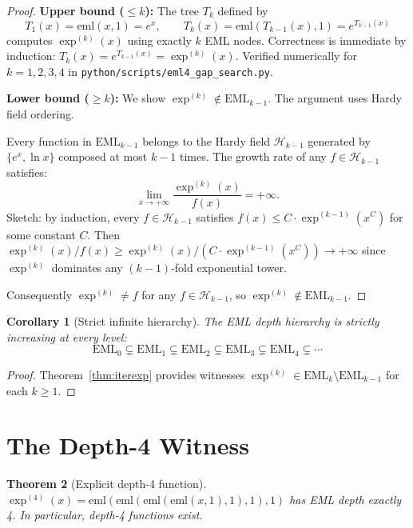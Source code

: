 \documentclass[11pt]{article}
\newtheorem{theorem}{Theorem}
\newtheorem{corollary}[theorem]{Corollary}
\begin{document}
\begin{proof}
\textbf{Upper bound ($\leq k$):}  The tree $T_k$ defined by
\[
T_1(x) = \mathrm{eml}(x, 1) = e^x, \qquad
T_k(x) = \mathrm{eml}(T_{k-1}(x), 1) = e^{T_{k-1}(x)}
\]
computes $\exp^{(k)}(x)$ using exactly $k$ EML nodes.  Correctness is
immediate by induction: $T_k(x) = e^{T_{k-1}(x)} = \exp^{(k)}(x)$.
Verified numerically for $k = 1, 2, 3, 4$ in
\texttt{python/scripts/eml4\_gap\_search.py}.

\textbf{Lower bound ($\geq k$):}  We show $\exp^{(k)} \notin \mathrm{EML}_{k-1}$.
The argument uses Hardy field ordering.

Every function in $\mathrm{EML}_{k-1}$ belongs to the Hardy field
$\mathcal{H}_{k-1}$ generated by $\{e^x, \ln x\}$ composed at most $k-1$
times.  The growth rate of any $f \in \mathcal{H}_{k-1}$ satisfies:
\[
\lim_{x \to +\infty} \frac{\exp^{(k)}(x)}{f(x)} = +\infty.
\]
Sketch: by induction, every $f \in \mathcal{H}_{k-1}$ satisfies
$f(x) \leq C \cdot \exp^{(k-1)}(x^C)$ for some constant $C$.
Then $\exp^{(k)}(x) / f(x) \geq \exp^{(k)}(x) / (C \cdot \exp^{(k-1)}(x^C))
\to +\infty$ since $\exp^{(k)}$ dominates any $(k-1)$-fold exponential tower.

Consequently $\exp^{(k)} \neq f$ for any $f \in \mathcal{H}_{k-1}$, so
$\exp^{(k)} \notin \mathrm{EML}_{k-1}$.
\end{proof}

\begin{corollary}[Strict infinite hierarchy]\label{cor:strict}
The EML depth hierarchy is strictly increasing at every level:
\[
\mathrm{EML}_0 \subsetneq \mathrm{EML}_1 \subsetneq \mathrm{EML}_2 \subsetneq
\mathrm{EML}_3 \subsetneq \mathrm{EML}_4 \subsetneq \cdots
\]
\end{corollary}

\begin{proof}
Theorem~\ref{thm:iterexp} provides witnesses $\exp^{(k)} \in
\mathrm{EML}_k \setminus \mathrm{EML}_{k-1}$ for each $k \geq 1$.
\end{proof}

\section{The Depth-4 Witness}

\begin{theorem}[Explicit depth-4 function]\label{thm:depth4}
$\exp^{(4)}(x) = \mathrm{eml}(\mathrm{eml}(\mathrm{eml}(\mathrm{eml}(x,1),1),1),1)$
has EML depth exactly 4.  In particular, depth-4 functions exist.
\end{theorem}
\end{document}
